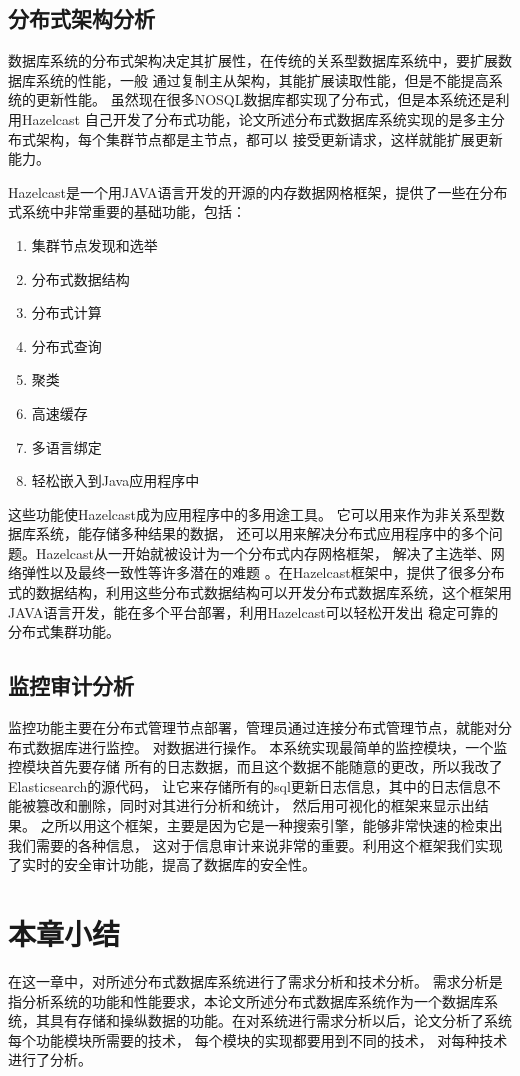 \subsection{分布式架构分析}
数据库系统的分布式架构决定其扩展性，在传统的关系型数据库系统中，要扩展数据库系统的性能，一般
通过复制主从架构，其能扩展读取性能，但是不能提高系统的更新性能。
虽然现在很多NOSQL数据库都实现了分布式，但是本系统还是利用Hazelcast
自己开发了分布式功能，论文所述分布式数据库系统实现的是多主分布式架构，每个集群节点都是主节点，都可以
接受更新请求，这样就能扩展更新能力。

Hazelcast是一个用JAVA语言开发的开源的内存数据网格框架，提供了一些在分布式系统中非常重要的基础功能，包括：
\begin{enumerate}
	\item 集群节点发现和选举
	\item 分布式数据结构
\item 	分布式计算
	\item 分布式查询
	\item 聚类
	\item 高速缓存
	\item 多语言绑定
\item 	轻松嵌入到Java应用程序中
\end{enumerate}

这些功能使Hazelcast成为应用程序中的多用途工具。
它可以用来作为非关系型数据库系统，能存储多种结果的数据，
还可以用来解决分布式应用程序中的多个问题。Hazelcast从一开始就被设计为一个分布式内存网格框架，
解决了主选举、网络弹性以及最终一致性等许多潜在的难题
。在Hazelcast框架中，提供了很多分布式的数据结构，利用这些分布式数据结构可以开发分布式数据库系统，这个框架用JAVA语言开发，能在多个平台部署，利用Hazelcast可以轻松开发出
稳定可靠的分布式集群功能。
\subsection{监控审计分析}
监控功能主要在分布式管理节点部署，管理员通过连接分布式管理节点，就能对分布式数据库进行监控。
对数据进行操作。
本系统实现最简单的监控模块，一个监控模块首先要存储
所有的日志数据，而且这个数据不能随意的更改，所以我改了Elasticsearch的源代码，
让它来存储所有的sql更新日志信息，其中的日志信息不能被篡改和删除，同时对其进行分析和统计，
然后用可视化的框架来显示出结果。
之所以用这个框架，主要是因为它是一种搜索引擎，能够非常快速的检束出我们需要的各种信息，
这对于信息审计来说非常的重要。利用这个框架我们实现了实时的安全审计功能，提高了数据库的安全性。
\section{本章小结}
在这一章中，对所述分布式数据库系统进行了需求分析和技术分析。
需求分析是指分析系统的功能和性能要求，本论文所述分布式数据库系统作为一个数据库系统，其具有存储和操纵数据的功能。在对系统进行需求分析以后，论文分析了系统每个功能模块所需要的技术，
每个模块的实现都要用到不同的技术，
对每种技术进行了分析。